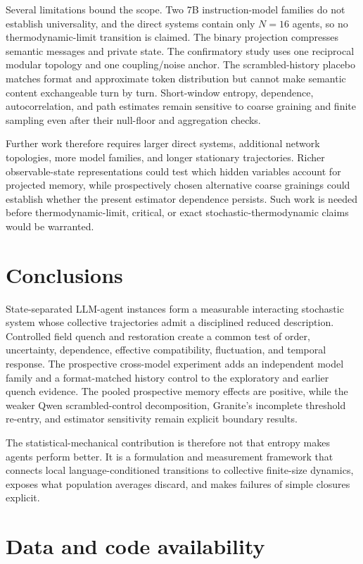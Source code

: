\documentclass[12pt]{article}
\begin{document}
Several limitations bound the scope.  Two 7B instruction-model families do
not establish universality, and the direct systems contain only $N=16$ agents,
so no thermodynamic-limit transition is claimed.  The binary projection
compresses semantic messages and private state.  The confirmatory study uses
one reciprocal modular topology and one coupling/noise anchor.  The
scrambled-history placebo matches format and approximate token distribution
but cannot make semantic content exchangeable turn by turn.  Short-window
entropy, dependence, autocorrelation, and path estimates remain sensitive to
coarse graining and finite sampling even after their null-floor and
aggregation checks.

Further work therefore requires larger direct systems, additional network
topologies, more model families, and longer stationary trajectories.  Richer
observable-state representations could test which hidden variables account
for projected memory, while prospectively chosen alternative coarse grainings
could establish whether the present estimator dependence persists.  Such work
is needed before thermodynamic-limit, critical, or exact
stochastic-thermodynamic claims would be warranted.

\section{Conclusions}
\label{sec:conclusions}

State-separated LLM-agent instances form a measurable interacting stochastic
system whose collective trajectories admit a disciplined reduced description.
Controlled field quench and restoration create a common test of
order, uncertainty, dependence, effective compatibility, fluctuation, and
temporal response.  The prospective cross-model experiment adds an independent
model family and a format-matched history control to the exploratory and
earlier quench evidence.  The pooled prospective memory effects are positive,
while the weaker Qwen scrambled-control decomposition, Granite's incomplete
threshold re-entry, and estimator sensitivity remain explicit boundary
results.

The statistical-mechanical contribution is therefore not that entropy makes
agents perform better.  It is a formulation and measurement framework that
connects local language-conditioned transitions to collective finite-size
dynamics, exposes what population averages discard, and makes failures of
simple closures explicit.

\section*{Data and code availability}
\end{document}
